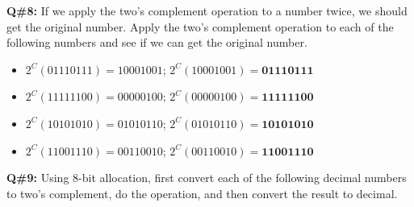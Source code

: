 \vspace{1em}

\textbf{Q\#8:} If we apply the two’s complement operation to a number twice, we should get the original number. Apply the two’s complement operation to each of the following numbers and see if we can get the original number.

\begin{itemize}
  \item[a)] $2^C(01110111) = 10001001$; $2^C(10001001) = \textbf{01110111}$
  \item[b)] $2^C(11111100) = 00000100$; $2^C(00000100) = \textbf{11111100}$
  \item[c)] $2^C(10101010) = 01010110$; $2^C(01010110) = \textbf{10101010}$
  \item[d)] $2^C(11001110) = 00110010$; $2^C(00110010) = \textbf{11001110}$
\end{itemize}

\vspace{1em}

\textbf{Q\#9:} Using 8-bit allocation, first convert each of the following decimal numbers to two’s complement, do the operation, and then convert the result to decimal.

